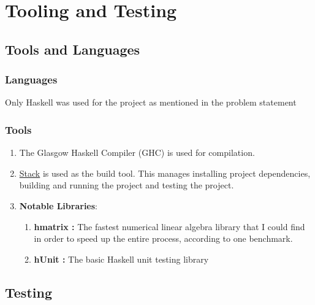 \documentclass[12pt]{scrreprt}
\begin{document}
\chapter{Tooling and Testing}

\section {Tools and Languages}


\subsection{Languages}

Only Haskell was used for the project as mentioned in the problem statement

\subsection{Tools}

\begin{enumerate}
    \item The Glasgow Haskell Compiler (GHC) is used for compilation.
    \item \href{https://docs.haskellstack.org/en/stable/}{Stack} is used as the build tool. This manages installing project dependencies, building and running the project and testing the project.
    
    \item \textbf{Notable Libraries}:
    \begin{enumerate}
        \item \textbf{hmatrix : } The fastest numerical linear algebra library that I could find in order to speed up the entire process, according to one benchmark. 
        \item \textbf{hUnit : } The basic Haskell unit testing library
    \end{enumerate} 
\end{enumerate}






\section{Testing}
\end{document}
